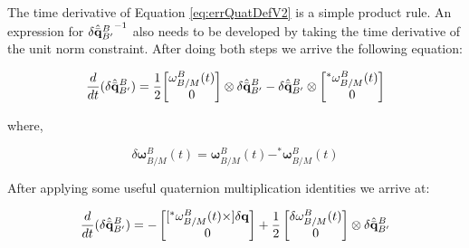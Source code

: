 \documentclass[conf]{new-aiaa}
\newcommand{\vect}[1]{\mathbf{#1}}
\newcommand{\qUnitGeneric}{\hat{\Bar{\mathbf{q}}}}
\newcommand{\errQuat}{\delta\qUnitGeneric^{B}_{B'}}
\newcommand{\errQuatInv}{{\delta\qUnitGeneric^{B}_{B'}}^{-1}}
\newcommand{\errwBM}{\delta\vect{\omega}^B_{B/M}}
\newcommand{\wBM}{\vect{\omega}^B_{B/M}}
\begin{document}
The time derivative of Equation \ref{eq:errQuatDefV2} is a simple product rule. An expression for $\errQuatInv$ also needs to be developed by taking the time derivative of the unit norm constraint. After doing both steps we arrive the following equation:

\begin{equation}
 \frac{d}{dt}({\errQuat}) =
 \frac{1}{2}{
 \begin{bmatrix}
     \wBM(t) \\ 0
 \end{bmatrix}
 \otimes 
 \errQuat
 -
 \errQuat \otimes
  \begin{bmatrix}
     ^*\wBM(t) \\ 0
 \end{bmatrix}
 }
\label{eq:mekfDir1}
\end{equation}

where,

\begin{equation}
    \errwBM(t) = \wBM(t) - ^*\wBM(t)
    \label{eq:mekfDir_errOmega}
\end{equation}


After applying some useful quaternion multiplication identities we arrive at:


\begin{equation}
 \frac{d}{dt}({\errQuat}) =
 -
 \begin{bmatrix}
     [^*\wBM(t) \times]\delta\vect{q} \\ 0
 \end{bmatrix}
 +
 \frac{1}{2}
 \begin{bmatrix}
     \errwBM(t) \\ 0
 \end{bmatrix}
 \otimes
 \errQuat
\label{eq:mekfDirToLinearize}
\end{equation}

\end{document}

